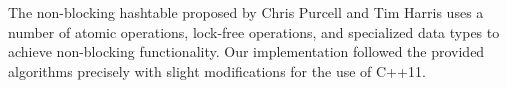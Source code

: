 \documentclass[journal]{IEEEtran}
\begin{document}
The non-blocking hashtable proposed by Chris Purcell and Tim Harris uses a number of atomic operations, lock-free operations, and specialized data types to achieve non-blocking functionality.  Our implementation followed the provided algorithms precisely with slight modifications for the use of C++11. 


\ifCLASSOPTIONcaptionsoff
  \newpage
\fi



\end{document}
